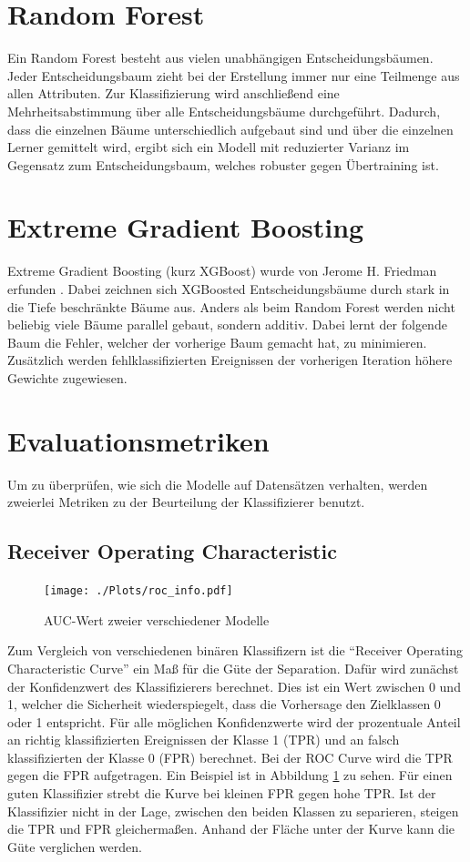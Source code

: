 \section{Random Forest}
Ein Random Forest besteht aus vielen unabhängigen Entscheidungsbäumen.
Jeder Entscheidungsbaum zieht bei der Erstellung immer nur eine Teilmenge aus allen Attributen.
Zur Klassifizierung wird anschließend eine Mehrheitsabstimmung über alle Entscheidungsbäume durchgeführt.
Dadurch, dass die einzelnen Bäume unterschiedlich aufgebaut sind und über die einzelnen Lerner gemittelt wird, ergibt sich ein Modell mit reduzierter Varianz im Gegensatz zum Entscheidungsbaum, welches robuster gegen Übertraining ist.
\section{Extreme Gradient Boosting}
Extreme Gradient Boosting (kurz XGBoost) wurde von Jerome H. Friedman erfunden \cite{xgboost}.
Dabei zeichnen sich  XGBoosted Entscheidungsbäume durch stark in die Tiefe beschränkte Bäume aus.
Anders als beim Random Forest werden nicht beliebig viele Bäume parallel gebaut, sondern additiv. 
Dabei lernt der folgende Baum die Fehler, welcher der vorherige Baum gemacht hat, zu minimieren.
Zusätzlich werden fehlklassifizierten Ereignissen der vorherigen Iteration höhere Gewichte zugewiesen.

\section{Evaluationsmetriken}
Um zu überprüfen, wie sich die Modelle auf Datensätzen verhalten, werden zweierlei Metriken zu der Beurteilung der Klassifizierer benutzt.
\subsection*{Receiver Operating Characteristic}
\begin{figure}
  \centering
  \texttt{[image: ./Plots/roc\_info.pdf]}
  \caption{AUC-Wert zweier verschiedener Modelle}
  \label{fig:roc}
\end{figure}
Zum Vergleich von verschiedenen binären Klassifizern ist die ``Receiver Operating Characteristic Curve'' ein Maß für die Güte der Separation. 
Dafür wird zunächst der Konfidenzwert des Klassifizierers berechnet. 
Dies ist ein Wert zwischen 0 und 1, welcher die Sicherheit wiederspiegelt, dass die Vorhersage den Zielklassen 0 oder 1 entspricht.
Für alle möglichen Konfidenzwerte wird der prozentuale Anteil an richtig klassifizierten Ereignissen der Klasse 1 (TPR) und an falsch klassifizierten der Klasse 0 (FPR) berechnet. 
Bei der ROC Curve wird die TPR gegen die FPR aufgetragen. 
Ein Beispiel ist in Abbildung \ref{fig:roc} zu sehen.
Für einen guten Klassifizier strebt die Kurve bei kleinen FPR gegen hohe TPR. 
Ist der Klassifizier nicht in der Lage, zwischen den beiden Klassen zu separieren, steigen die TPR und FPR gleichermaßen. 
Anhand der Fläche unter der Kurve kann die Güte verglichen werden.

